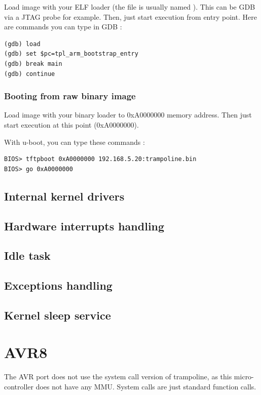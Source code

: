 Load image with your ELF loader (the file is usually named ). This can be GDB via a JTAG probe for example. Then, just start execution from  entry point. Here are commands you can type in GDB :
\begin{lstlisting}
(gdb) load
(gdb) set $pc=tpl_arm_bootstrap_entry
(gdb) break main
(gdb) continue
\end{lstlisting}

\subsubsection{Booting from raw binary image}

Load image with your binary loader to 0xA0000000 memory address. Then just start execution at this point (0xA0000000).

With u-boot, you can type these commands :
\begin{lstlisting}
BIOS> tftpboot 0xA0000000 192.168.5.20:trampoline.bin
BIOS> go 0xA0000000
\end{lstlisting}

\subsection{Internal kernel drivers}

\subsection{Hardware interrupts handling}

\subsection{Idle task}

\subsection{Exceptions handling}

\subsection{Kernel sleep service}

\section{AVR8}
\label{sec:avr8port}

The AVR port does not use the system call version of trampoline, as this micro-controller does not have any MMU. System calls are just standard function calls.

